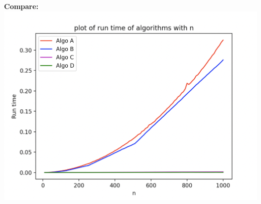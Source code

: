 \documentclass[a4paper]{exam}
\theoremstyle{mytheoremstyle}
\theoremstyle{mytheoremstyle}
\theoremstyle{myproblemstyle}
\begin{document}
\begin{questions}
\begin{solution}
		\textbf{Compare: }
		\\\includegraphics[scale = 0.5]{plot(10,1001,10).png}

	\end{solution}

\end{questions}
\end{document}
